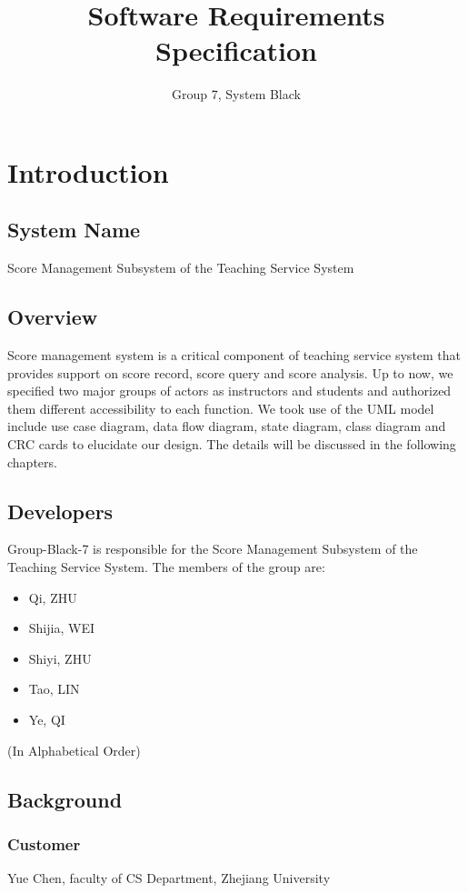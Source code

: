 \documentclass[a4]{article}
\author{Group 7, System Black}
\title{Software Requirements Specification}
\begin{document}
\maketitle
\section{Introduction}
\subsection{System Name}
Score Management Subsystem of the Teaching Service System
\subsection{Overview}
Score management system is a critical component of teaching service system that provides support on score record, score query and score analysis. Up to now, we specified two major groups of actors as instructors and students and authorized them different accessibility to each function. We took use of the UML model include use case diagram, data flow diagram, state diagram, class diagram and CRC cards to elucidate our design. The details will be discussed in the following chapters.
\subsection{Developers}

Group-Black-7 is responsible for the Score Management Subsystem of the Teaching Service System. The members of the group are:

\begin{itemize}
\item Qi, ZHU

\item Shijia, WEI

\item Shiyi, ZHU

\item Tao, LIN

\item Ye, QI
\end{itemize}
(In Alphabetical Order)

\subsection{Background}
\subsubsection{Customer}
Yue Chen, faculty of CS Department, Zhejiang University 
\end{document}
